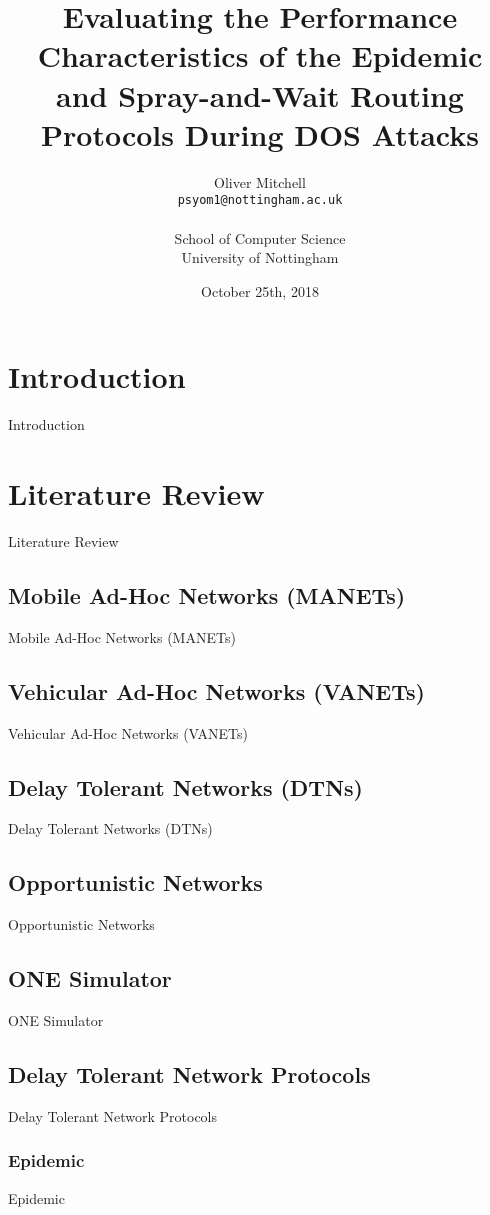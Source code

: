 \documentclass{article}
\title{Evaluating the Performance Characteristics of the Epidemic and Spray-and-Wait Routing Protocols During DOS Attacks}
\author{
  Oliver Mitchell\\
  \texttt{psyom1@nottingham.ac.uk}\\\\
  \textnormal{School of Computer Science}\\
  \textnormal{University of Nottingham}
}
\date{October 25th, 2018}
\begin{document}
\maketitle
 
\tableofcontents

\section{Introduction}
Introduction
 
\section{Literature Review}
Literature Review

\subsection{Mobile Ad-Hoc Networks (MANETs)}
Mobile Ad-Hoc Networks (MANETs)

\subsection{Vehicular Ad-Hoc Networks (VANETs)}
Vehicular Ad-Hoc Networks (VANETs)

\subsection{Delay Tolerant Networks (DTNs)}
Delay Tolerant Networks (DTNs)

\subsection{Opportunistic Networks}
Opportunistic Networks

\subsection{ONE Simulator}
ONE Simulator

\subsection{Delay Tolerant Network Protocols}
Delay Tolerant Network Protocols

\subsubsection{Epidemic}
Epidemic
\end{document}
